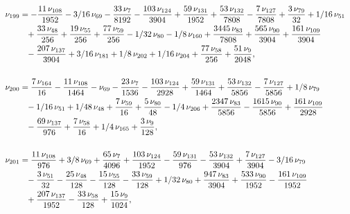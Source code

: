 \documentclass[a4paper,12pt, DIV=14, BCOR=5mm, twoside, headsepline, numbers=noenddot]{scrbook}
\begin{document}
\begin{align}
\begin{aligned}
\\
\nu_{{199}}&=-{\frac {11\,\nu_{{108}}}{1952}}-3/16\,\nu_{{69}}-{\frac {
33\,\nu_{{7}}}{8192}}-{\frac {103\,\nu_{{124}}}{3904}}+{\frac {59\,\nu
_{{131}}}{1952}}+{\frac {53\,\nu_{{132}}}{7808}}-{\frac {7\,\nu_{{127}
}}{7808}}+{\frac {3\,\nu_{{79}}}{32}}+1/16\,\nu_{{51}}\\
 &\hphantom{=}+{\frac {33\,\nu
_{{48}}}{256}}+{\frac {19\,\nu_{{55}}}{256}}+{\frac {77\,\nu_{{59}}}{
256}}-1/32\,\nu_{{80}}-1/8\,\nu_{{160}}+{\frac {3445\,\nu_{{83}}}{7808
}}+{\frac {565\,\nu_{{90}}}{3904}}+{\frac {161\,\nu_{{109}}}{3904}}\\
 &\hphantom{=}-{
\frac {207\,\nu_{{137}}}{3904}}+3/16\,\nu_{{181}}+1/8\,\nu_{{202}}+1/
16\,\nu_{{204}}+{\frac {77\,\nu_{{58}}}{256}}+{\frac {51\,\nu_{{9}}}{
2048}}, \\
\\
\nu_{{200}}&={\frac {7\,\nu_{{164}}}{16}}-{\frac {11\,\nu_{{108}
}}{1464}}-\nu_{{69}}-{\frac {23\,\nu_{{7}}}{1536}}-{\frac {103\,\nu_{{
124}}}{2928}}+{\frac {59\,\nu_{{131}}}{1464}}+{\frac {53\,\nu_{{132}}
}{5856}}-{\frac {7\,\nu_{{127}}}{5856}}+1/8\,\nu_{{79}}\\
 &\hphantom{=}-1/16\,\nu_{{51
}}+1/48\,\nu_{{48}}+{\frac {7\,\nu_{{59}}}{16}}+{\frac {5\,\nu_{{80}}
}{48}}-1/4\,\nu_{{206}}+{\frac {2347\,\nu_{{83}}}{5856}}-{\frac {1615
\,\nu_{{90}}}{5856}}+{\frac {161\,\nu_{{109}}}{2928}}\\
 &\hphantom{=}-{\frac {69\,\nu_
{{137}}}{976}}+{\frac {7\,\nu_{{58}}}{16}}+1/4\,\nu_{{165}}+{\frac {3
\,\nu_{{9}}}{128}}, \\
\\
\nu_{{201}}&={\frac {11\,\nu_{{108}}}{976}}+3/8\,\nu
_{{69}}+{\frac {65\,\nu_{{7}}}{4096}}+{\frac {103\,\nu_{{124}}}{1952}}
-{\frac {59\,\nu_{{131}}}{976}}-{\frac {53\,\nu_{{132}}}{3904}}+{
\frac {7\,\nu_{{127}}}{3904}}-3/16\,\nu_{{79}}\\
 &\hphantom{=}-{\frac {3\,\nu_{{51}}}{
32}}-{\frac {25\,\nu_{{48}}}{128}}-{\frac {15\,\nu_{{55}}}{128}}-{
\frac {33\,\nu_{{59}}}{128}}+1/32\,\nu_{{80}}+{\frac {947\,\nu_{{83}}
}{3904}}+{\frac {533\,\nu_{{90}}}{1952}}-{\frac {161\,\nu_{{109}}}{
1952}}\\
 &\hphantom{=}+{\frac {207\,\nu_{{137}}}{1952}}-{\frac {33\,\nu_{{58}}}{128}}+
{\frac {15\,\nu_{{9}}}{1024}},
\end{aligned}
\end{align}
\end{document}

